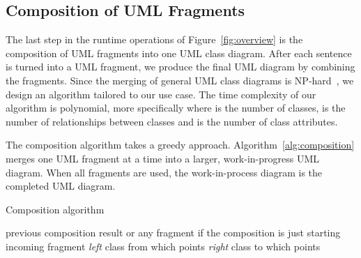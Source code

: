 \documentclass[sigconf]{acmart}
\begin{document}
\subsection{Composition of UML Fragments} \label{sec:composition}
The last step in the runtime operations of Figure~\ref{fig:overview} is the composition of UML fragments into one UML class diagram. After each sentence is turned into a UML fragment, we produce the final UML diagram by combining the fragments. Since the merging of general UML class diagrams is NP-hard~\cite{Rubin:2013merging}, we design an algorithm tailored to our use case. The time complexity of our algorithm is polynomial, more specifically  where  is the number of classes,  is the number of relationships between classes and  is the number of class attributes. 

The composition algorithm takes a greedy approach. Algorithm~\ref{alg:composition} merges one UML fragment at a time into a larger, work-in-progress UML diagram. When all fragments are used, the work-in-process diagram is the completed UML diagram.

\begin{algorithm}
\caption{Composition algorithm}\label{alg:composition}
\begin{algorithmic}[1]
\State  previous composition result or any fragment if the composition is just starting
\State  incoming fragment
        \Else {}
        \EndIf
    \Else {}
    \EndIf
{}
    \EndIf
    \State \textit{left}  class from which  points
    \State \textit{right}  class to which  points
    
    \EndIf
    
    \EndIf
    
    \Else {}
    \EndIf
\EndIf
\State \Return 
\end{algorithmic}
\end{algorithm}
\end{document}
